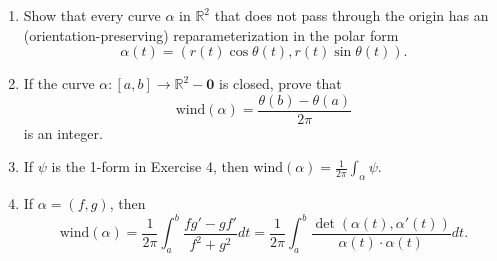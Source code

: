 \documentclass[10pt]{report}
\begin{document}
\begin{exer}[4.6: 5]
\begin{enumerate}
	\item Show that every curve $\alpha$ in $\mathbb{R}^2$ that does not pass through the origin has an (orientation-preserving) reparameterization in the polar form
		\[
			\alpha(t) = (r(t) \cos \theta(t), r(t) \sin \theta(t)).
		\] 
	\item If the curve $\alpha:[a,b]\to \mathbb{R}^2-\mathbf{0}$ is closed, prove that
		\[
			\text{wind}(\alpha) = \frac{\theta(b)-\theta(a)}{2\pi} 
		\] is an integer.
	\item If $\psi$ is the 1-form in Exercise 4, then $\text{wind}(\alpha)=\frac{1}{2\pi} \int_{\alpha} \psi$.
	\item If $\alpha=(f,g)$, then
		\[
			\text{wind}(\alpha)=\frac{1}{2\pi } \int_{a}^{b} \frac{fg'-gf'}{f^2+g^2} dt = \frac{1}{2\pi } \int_{a}^{b} \frac{\det(\alpha(t), \alpha'(t))}{\alpha(t)\cdot \alpha(t)} dt.
		\] 
\end{enumerate}
\end{exer}
\end{document}
